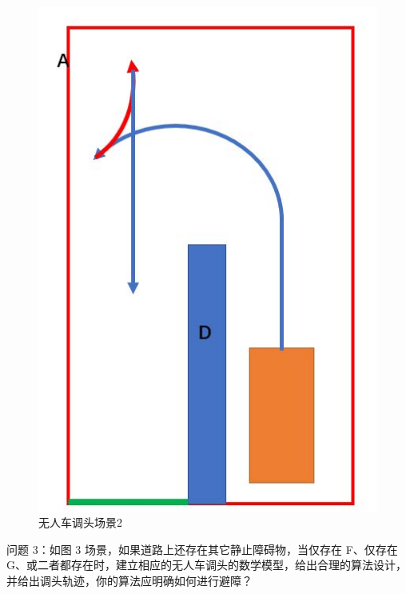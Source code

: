 \documentclass{article}
\begin{document}
\begin{figure}[H]%
    \centering
    \includegraphics[scale=0.8]{2.jpg}
    \caption{无人车调头场景2}
\end{figure}

问题 3：如图 3 场景，如果道路上还存在其它静止障碍物，当仅存在 F、仅存在 G、或二者都存在时，建立相应的无人车调头的数学模型，给出合理的算法设计，并给出调头轨迹，你的算法应明确如何进行避障？
\end{document}
